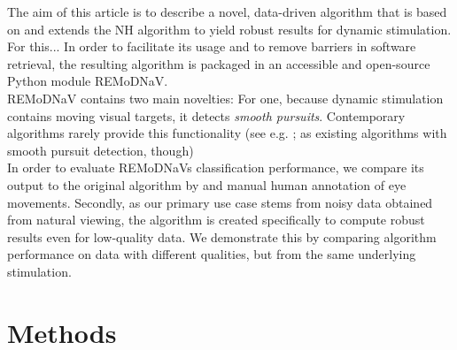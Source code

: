 The aim of this article is to describe a novel, data-driven algorithm that is based on and extends
the NH algorithm to yield robust results for dynamic stimulation. For this... 
In order to facilitate its usage and to remove barriers in software retrieval, the resulting algorithm is packaged in an accessible and open-source Python module REMoDNaV.\\
 REMoDNaV contains two main novelties: For one, because dynamic stimulation contains moving visual targets, it detects \textit{smooth pursuits}. Contemporary algorithms rarely provide this functionality (see e.g. \cite{LARSSON2015145}; \cite{Komogortsev2013} as existing algorithms with smooth pursuit detection, though)\\
 In order to evaluate REMoDNaVs classification performance, we compare its output to the original algorithm by \citet{Nystrom2010AnData} and manual human annotation of eye movements. Secondly, as our primary use case stems from noisy data obtained from natural viewing, the algorithm is created specifically to compute robust results even for low-quality data. We demonstrate this by comparing algorithm performance on data with different qualities, but from the same underlying stimulation.








\section*{Methods}\label{methods}


